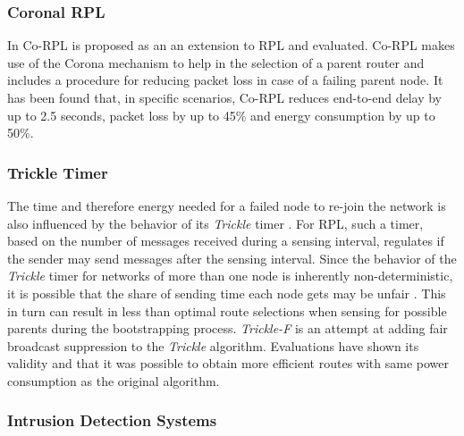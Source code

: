 \documentclass[
  a4paper,
  11pt,
  style=screen,
  extramargin,
  bcor=10mm,
  rgb,
  hyperrefdark,
  abstract=off,
  lnum,
]{tubsartcl}
\begin{document}
\subsubsection{Coronal RPL}

In \cite{gaddour2014co} \ac{Co-RPL} is proposed as an an extension to \ac{RPL} and evaluated.
Co-\ac{RPL} makes use of the Corona mechanism \cite{olariu2006design} to help in the selection of a parent router and includes a procedure for reducing packet loss in case of a failing parent node.
It has been found that, in specific scenarios, \ac{Co-RPL} reduces end-to-end delay by up to 2.5 seconds, packet loss by up to 45\% and energy consumption by up to 50\%.

\subsubsection{Trickle Timer}

The time and therefore energy needed for a failed node to re-join the network is also influenced by the behavior of its \emph{Trickle} timer \cite{levis2004trickle}.
For \ac{RPL}, such a timer, based on the number of messages received during a sensing interval, regulates if the sender may send messages after the sensing interval.
Since the behavior of the \emph{Trickle} timer for networks of more than one node is inherently non-deterministic, it is possible that the share of sending time each node gets may be unfair \cite{vallati2013trickle}.
This in turn can result in less than optimal route selections when sensing for possible parents during the bootstrapping process.
\emph{Trickle-F} \cite{vallati2013trickle} is an attempt at adding fair broadcast suppression to the \emph{Trickle} algorithm.
Evaluations have shown its validity and that it was possible to obtain more efficient routes with same power consumption as the original algorithm.

\subsubsection{Intrusion Detection Systems}
\end{document}
